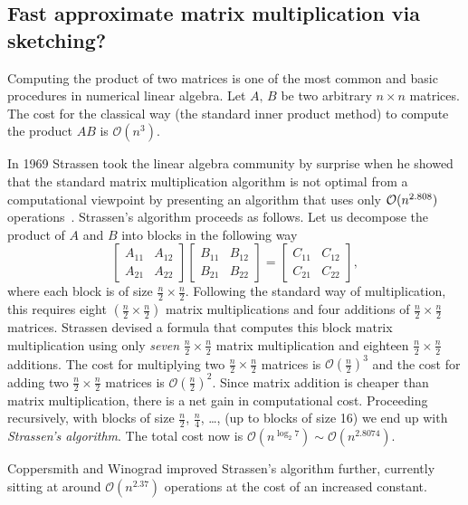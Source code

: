 \subsection{Fast approximate matrix multiplication via sketching?}

Computing the product of two matrices is one of the most common and basic procedures in numerical linear algebra.
Let $A,\,B$ be two arbitrary $n\times n$ matrices. The cost for the classical way (the standard inner product method) to compute the product $AB$  is ${\mathcal O}(n^3)$.

In 1969 Strassen took the linear algebra community by surprise when he showed that the standard matrix
multiplication algorithm is not optimal from a computational viewpoint by presenting an algorithm that uses  only
${\mathcal{O}}(n^{2.808})$ operations~\cite{Strassen1969}.
Strassen's algorithm proceeds as follows.
Let us decompose the product of $A$ and $B$ into blocks
in the following way
$$
\begin{bmatrix} A_{11}&A_{12} \\ A_{21}&A_{22} \end{bmatrix}
\begin{bmatrix} B_{11}&B_{12} \\ B_{21}&B_{22} \end{bmatrix} =
\begin{bmatrix}  C_{11}&C_{12} \\ C_{21}&C_{22} \end{bmatrix},
$$
where  each block is of size $\frac{n}{2}\times\frac{n}{2}$. Following the standard
way of multiplication, this requires eight $\left(\frac{n}{2}\times\frac{n}{2}\right)$ matrix multiplications
and four additions of $\frac{n}{2}\times\frac{n}{2}$ matrices.
Strassen devised a formula that computes this block matrix multiplication using only {\em seven}
$\frac{n}{2}\times\frac{n}{2}$ matrix multiplication and eighteen $\frac{n}{2}\times\frac{n}{2}$ additions.
The cost for multiplying two $\frac{n}{2}\times\frac{n}{2}$ matrices is ${\mathcal O}\left(\frac{n}{2}\right)^3$ and the cost
for adding two $\frac{n}{2}\times\frac{n}{2}$ matrices is ${\mathcal O}\left(\frac{n}{2}\right)^2$. Since matrix addition is cheaper than matrix multiplication, there is a net gain in computational cost.
Proceeding recursively, with blocks of size $\frac{n}{2}$, $\frac{n}{4}$, \ldots, (up to blocks of size 16)
we end up with {\em Strassen's algorithm}. The total cost now is $\mathcal{O}(n^{\log_2 7})\sim \mathcal{O}(n^{2.8074})$.


Coppersmith and Winograd improved Strassen's algorithm further, currently sitting at around ${\mathcal O}(n^{2.37})$ operations at the cost of an increased constant.

